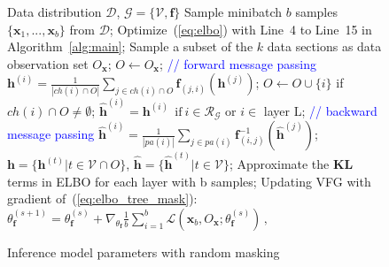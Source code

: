 \documentclass{article}
\begin{document}
 \begin{figure}
\begin{minipage}{0.55\textwidth}
\begin{algorithm}[H]
   \caption{Inference model parameters with random masking}
   \label{alg:rand_mask}
\begin{algorithmic}[1]
    Data distribution $\mathcal{D}$,  $\mathcal{G} = \{\mathcal{V}, \mathbf{f}\}$
   \STATE  Sample minibatch $b$ samples $\{\mathbf{x}_1, ..., \mathbf{x}_b \}$ from $\mathcal{D}$;
   \STATE  
    Optimize~(\ref{eq:elbo}) with Line~4 to Line~15 in Algorithm~\ref{alg:main};
    \STATE  Sample a subset of the $k$ data sections as data observation set $O_{\mathbf{x}}$; $O \leftarrow O_{\mathbf{x}}$;
    \STATE  \textcolor{blue}{// forward message passing}
   \STATE $\mathbf{h}^{(i)} = \frac{1}{|ch(i) \cap O |} \sum_{j \in ch(i) \cap O} \mathbf{f}_{(j,i)}(\mathbf{h}^{(j)})$; 
     \STATE  $O \leftarrow O \cup \{i\}$ if $ch(i) \cap O \neq \emptyset $; 
    \ENDFOR
    \STATE $\widehat{\mathbf{h}}^{(i)} = \mathbf{h}^{(i)} \ \  \text{if} \ i \in \mathcal{R}_{\mathcal{G}} $ or $i \in$ layer L;
   \STATE \textcolor{blue}{// backward message passing}
   \STATE $\widehat{\mathbf{h}}^{(i)} = \frac{1}{|pa(i)|} \sum_{j \in pa(i) } \mathbf{f}^{-1}_{ (i,j)}(\widehat{\mathbf{h}}^{(j)}) $;%
   \ENDFOR
    \STATE  $\mathbf{h} =  \{\mathbf{h}^{(t)} \big |  t \in \mathcal{V} \cap O \}$, $\widehat{\mathbf{h}} =  \{\widehat{\mathbf{h}}^{(t)} \big | t \in \mathcal{V} \}$;
    \STATE Approximate the $\mathbf{KL}$ terms in ELBO for each layer with b samples;
    \STATE Updating VFG with gradient of~(\ref{eq:elbo_tree_mask}): $\theta^{(s+1)}_{\mathbf{f}} = \theta^{(s)}_{\mathbf{f}} + \nabla_{\theta_{\mathbf{f}}}\frac{1}{b} \sum_{i=1}^b  \mathcal{L}(\mathbf{x}_b, O_{\mathbf{x}}; \theta^{(s)}_{\mathbf{f}})   \, ,$
   \ENDFOR
\end{algorithmic}
\end{algorithm}
\end{minipage}
 \vspace{-0.1in}
\end{figure}
\vspace{-0.1in}
\end{document}
